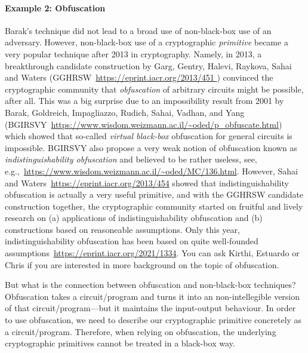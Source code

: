 \documentclass[a4paper,table,dvipsnames]{article}
\theoremstyle{definition}
\begin{document}
\paragraph{Example 2: Obfuscation} Barak's technique did not lead to a broad use of non-black-box use
of an adversary. However, non-black-box use of a cryptographic \emph{primitive} became a very popular
technique after 2013 in cryptography. Namely, in 2013, a breakthrough candidate construction by 
Garg, Gentry, Halevi, Raykova, Sahai and Waters (GGHRSW~\url{https://eprint.iacr.org/2013/451
}) convinced the cryptographic community that
\emph{obfuscation} of arbitrary circuits might be possible, after all. This was a big surprise
due to an impossibility result from 2001 by Barak, Goldreich, Impagliazzo, Rudich, Sahai, Vadhan, and 
Yang (BGIRSVY~\url{https://www.wisdom.weizmann.ac.il/~oded/p_obfuscate.html}) which showed that so-called
\emph{virtual black-box} obfuscation for general circuits is impossible. BGIRSVY also propose a very
weak notion of obfuscation known as \emph{indistinguishability obfuscation} and believed to be rather
useless, see, e.g.,~\url{https://www.wisdom.weizmann.ac.il/~oded/MC/136.html}. However, Sahai and
Waters~\url{https://eprint.iacr.org/2013/454} showed that indistinguishability obfuscation is actually 
a very useful primitive, and with the GGHRSW candidate construction together, the cryptographic
community started on fruitful and lively research on (a) applications of indistinguishability obfuscation
and (b) constructions based on reasoneable assumptions. Only this year, indistinguishability obfuscation
has been based on quite well-founded assumptions~\url{https://eprint.iacr.org/2021/1334}. You can ask
Kirthi, Estuardo or Chris if you are interested in more background on the topic of obfuscation. 

But what is the connection between obfuscation and non-black-box techniques? Obfuscation takes a circuit/program
and turns it into an non-intellegible version of that circuit/program---but it maintains the input-output
behaviour. In order to use obfuscation, we need to describe our cryptographic primitive concretely as a circuit/program.
Therefore, when relying on obfuscation, the underlying cryptographic primitives cannot be treated in a
black-box way.
\end{document}
